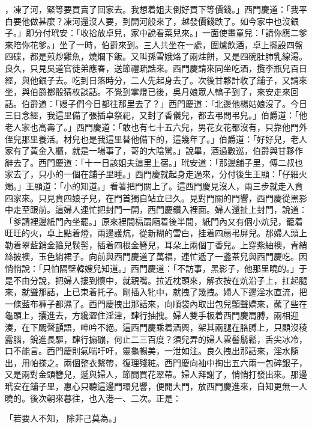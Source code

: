 \begin{showcontents}{}
，凍了河，緊等要買賣了回家去。我想着姐夫倒好買下等價錢。」西門慶道：「我平白要他做甚麼？凍河還沒人要，到開河般來了，越發價錢跌了。如今家中也沒銀子。」即分付玳安：「收拾放卓兒，家中說看菜兒來。」一面使畫童兒：「請你應二爹來陪你花爹。」坐了一時，伯爵來到。三人共坐在一處，圍爐飲酒，卓上擺設四盤四碟，都是煎炒雞魚，燒爛下飯。又叫孫雪娥烙了兩炷餅，又是四碗肚肺乳線湯。良久，只見吳道官徒弟應春，送節禮疏誥來。西門慶請來同坐吃酒，攬李瓶兒百日經，與他銀子去。吃到日落時分，二人先起身去了。次後甘夥計收了舖子，又請來坐，與伯爵擲骰猜枚談話。不覺到掌燈已後，吳月娘眾人轎子到了，來安走來回話。伯爵道：「嫂子們今日都往那里去了？」西門慶道：「北邊他楊姑娘沒了。今日三日念經，我這里備了張插卓祭祀，又封了香儀兒，都去弔問弔兒。」伯爵道：「他老人家也高壽了。」西門慶道：「敢也有七十五六兒，男花女花都沒有，只靠他門外侄兒那里養活。材兒也是我這里替他備下的，這幾年了。」伯爵道：「好好兒，老人家有了黃金入櫃，就是一場事了，哥的大陰騭。」說畢，酒過數巡，伯爵與甘夥作辭去了。西門慶道：「十一日該姐夫這里上宿。」玳安道：「那邊舖子里，傅二叔也家去了，只小的一個在舖子里睡。」西門慶就起身走過來，分付後生王顯：「仔細火燭。」王顯道：「小的知道。」看著把門關上了。這西門慶見沒人，兩三步就走入賁四家來。只見賁四娘子兒，在門首獨自站立已久。見對門關的門響，西門慶從黑影中走至跟前。這婦人連忙把封門一開，西門慶鑽入裡面。婦人還扯上封門，說道：「爹請裡邊紙門內坐罷。」原來裡間槅扇廂着後半間，紙門內又有個小炕兒，籠着旺旺的火，卓上點着燈，兩邊護炕，從新糊的雪白，挂着四扇弔屏兒。那婦人頭上勒着翠藍銷金箍兒䯼髻，插着四根金簪兒，耳朵上兩個丁香兒。上穿紫紬襖，青綃絲披襖，玉色綃裙子。向前與西門慶道了萬福，連忙遞了一盞茶兒與西門慶吃。因悄悄說：「只怕隔壁韓嫂兒知道。」西門慶道：「不訪事，黑影子，他那里曉的。」于是不由分說，把婦人摟到懷中，就親嘴。拉近枕頭來，解衣按在炕沿子上，扛起腿來，就聳那話，上已束着托子。剛插入牝中，就拽了幾拽。婦人下邊淫水直流，把一條藍布褲子都濕了。西門慶拽出那話來，向順袋內取出包兒顫聲嬌來，蘸了些在龜頭上，攮進去，方纔澀住淫津，肆行抽拽。婦人雙手板着西門慶肩膊，兩相迎湊，在下颺聲顫語，呻吟不絕。這西門慶乘着酒興，架其兩腿在胳膊上，只顧沒稜露腦，銳進長驅，肆行搧磞，何止二三百度？須兒弄的婦人雲髻鬅鬆，舌尖冰冷，口不能言。西門慶則氣喘吁吁，靈龜暢美，一泄如注。良久拽出那話來，淫水隨出，用帕搽之。兩個整衣繫帶，復理殘粧。西門慶向袖中掏出五六兩一包碎銀子，又是兩對金頭簪兒，遞與婦人，節間買花翠帶。婦人拜謝了，悄悄打發出來。那邊玳安在舖子里，惠心只聽這邊門環兒響，便開大門，放西門慶進來，自知更無一人曉的。後次朝來暮往，也入港一、二次。正是：

「若要人不知，  除非己莫為。」


\end{showcontents}
